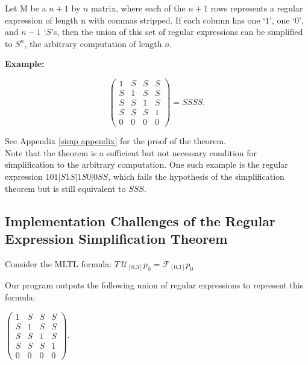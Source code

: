 \documentclass[runningheads]{llncs}
\begin{document}
\begin{theorem} \label{simp}
Let M be a $n+1$ by $n$ matrix, where each of the $n+1$ rows represents a regular expression of length n with commas stripped. If each column has one `$1$', one `$0$', and $n-1$ `$S$'s, then the union of this set of regular expressions can be simplified to $S^n$, the arbitrary computation of length $n$.
\end{theorem}

\noindent \textbf{Example:}
\vspace{-0.05\textwidth}
\begin{center}
\[
    \begin{pmatrix} \label{example1}
    1 & S & S & S\\
    S & 1 & S & S\\
    S & S & 1 & S\\
    S & S & S & 1\\
    0 & 0 & 0 & 0
    \end{pmatrix} = SSSS.
\]
\end{center}

\noindent See Appendix \ref{simp appendix} for the proof of the theorem.\\

Note that the theorem is a sufficient but not necessary condition for simplification to the arbitrary computation. One such example is the regular expression $101|S1S|1S0|0SS$, which fails the hypothesis of the simplification theorem but is still equivalent to $SSS$.

\subsection{Implementation Challenges of the Regular Expression Simplification Theorem}

\begin{example} \label{example1}
Consider the MLTL formula:
$T \ \mathcal{U_{[\text{0,3}]}} p_0 = \mathcal{F_{[\text{0,3}]}}p_0$
\end{example}
Our program outputs the following union of regular expressions to represent this formula:

\begin{center}
    $
    \begin{pmatrix}
    1 & S & S & S\\
    S & 1 & S & S\\
    S & S & 1 & S\\
    S & S & S & 1\\
    0 & 0 & 0 & 0
    \end{pmatrix}.
$
\end{center}
\end{document}
